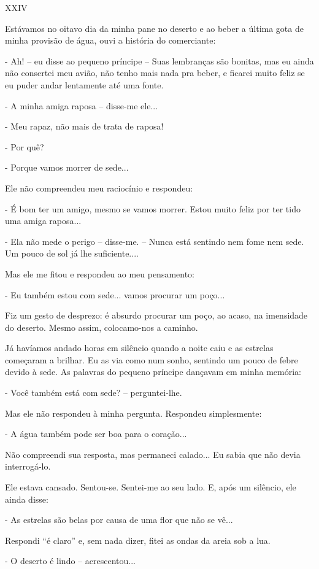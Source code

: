 XXIV

Estávamos no oitavo dia da minha pane no deserto e ao beber a última
gota de minha provisão de água, ouvi a história do comerciante:

- Ah! -- eu disse ao pequeno príncipe -- Suas lembranças são bonitas,
mas eu ainda não consertei meu avião, não tenho mais nada pra beber, e
ficarei muito feliz se eu puder andar lentamente até uma fonte.

- A minha amiga raposa -- disse-me ele...

- Meu rapaz, não mais de trata de raposa!

- Por quê?

- Porque vamos morrer de sede...

Ele não compreendeu meu raciocínio e respondeu:

- É bom ter um amigo, mesmo se vamos morrer. Estou muito feliz por ter
tido uma amiga raposa...

- Ela não mede o perigo -- disse-me. -- Nunca está sentindo nem fome nem
sede. Um pouco de sol já lhe suficiente....

Mas ele me fitou e respondeu ao meu pensamento:

- Eu também estou com sede... vamos procurar um poço...

Fiz um gesto de desprezo: é absurdo procurar um poço, ao acaso, na
imensidade do deserto. Mesmo assim, colocamo-nos a caminho.

Já havíamos andado horas em silêncio quando a noite caiu e as estrelas
começaram a brilhar. Eu as via como num sonho, sentindo um pouco de
febre devido à sede. As palavras do pequeno príncipe dançavam em minha
memória:

- Você também está com sede? -- perguntei-lhe.

Mas ele não respondeu à minha pergunta. Respondeu simplesmente:

- A água também pode ser boa para o coração...

Não compreendi sua resposta, mas permaneci calado... Eu sabia que não
devia interrogá-lo.

Ele estava cansado. Sentou-se. Sentei-me ao seu lado. E, após um
silêncio, ele ainda disse:

- As estrelas são belas por causa de uma flor que não se vê...

Respondi ``é claro'' e, sem nada dizer, fitei as ondas da areia sob a
lua.

- O deserto é lindo -- acrescentou...

